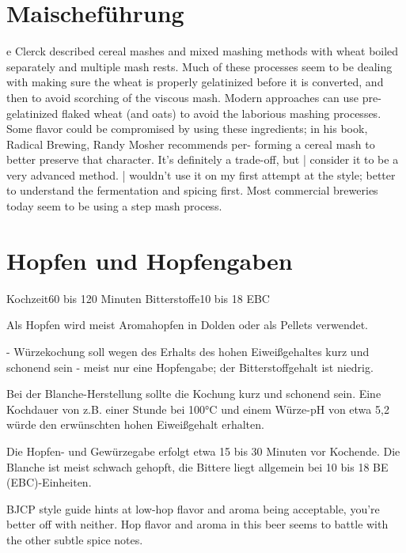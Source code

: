 \documentclass[a4paper,parskip=half]{scrartcl}
\begin{document}
\section*{Maischeführung}

\parencite[26]{Strong2021}
e Clerck described
cereal mashes and mixed mashing methods with wheat
boiled separately and multiple mash rests. Much of these
processes seem to be dealing with making sure the wheat is
properly gelatinized before it is converted, and then to avoid
scorching of the viscous mash.
Modern approaches can use pre-gelatinized flaked wheat
(and oats) to avoid the laborious mashing processes. Some
flavor could be compromised by using these ingredients; in
his book, Radical Brewing, Randy Mosher recommends per-
forming a cereal mash to better preserve that character. It’s
definitely a trade-off, but | consider it to be a very advanced
method. | wouldn't use it on my first attempt at the style;
better to understand the fermentation and spicing first. Most
commercial breweries today seem to be using a step mash
process.


\section*{Hopfen und Hopfengaben}

\parencite[13]{Strottner1999}
Kochzeit60 bis 120 Minuten
Bitterstoffe10 bis 18 EBC

\parencite[1]{Strottner1999}
Als Hopfen wird meist
Aromahopfen in Dolden oder als Pellets verwendet.


\parencite[2]{Strottner1999}
- Würzekochung soll wegen des Erhalts des hohen Eiweißgehaltes kurz und schonend sein
- meist nur eine Hopfengabe; der Bitterstoffgehalt ist niedrig.

\parencite[17]{Strottner1999}
Bei der Blanche-Herstellung sollte die Kochung kurz und schonend sein. Eine
Kochdauer von z.B. einer Stunde bei 100°C und einem Würze-pH von etwa 5,2
würde den erwünschten hohen Eiweißgehalt erhalten.

\parencite[17]{Strottner1999}
Die Hopfen- und Gewürzegabe erfolgt etwa 15 bis 30 Minuten vor Kochende. Die
Blanche ist meist schwach gehopft, die Bittere liegt allgemein bei 10 bis 18 BE
(EBC)-Einheiten.

\parencite{Zainasheff2007}
BJCP style guide hints at low-hop flavor and aroma being acceptable, you’re better
off with neither. Hop flavor and aroma in this beer seems to battle with the other subtle spice notes.
\end{document}
